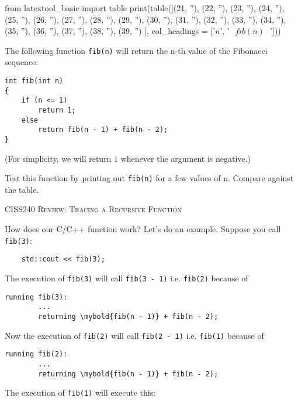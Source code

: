 \newpage
\begin{python}
from latextool_basic import table
print(table([(21, ''),
             (22, ''),
             (23, ''),
             (24, ''),
             (25, ''),
             (26, ''),
             (27, ''),
             (28, ''),
             (29, ''),
             (30, ''),
             (31, ''),
             (32, ''),
             (33, ''),
             (34, ''),
             (35, ''),
             (36, ''),
             (37, ''),
             (38, ''),
             (39, '')
            ],
            col_headings = ['$n$', '$\ \ \ fib(n)\ \ \ $']))
\end{python}

The following function \verb!fib(n)! will return the n-th value of the Fibonacci sequence:


\begin{Verbatim}[frame=single]
int fib(int n)
{
    if (n <= 1)
        return 1;
    else
        return fib(n - 1) + fib(n - 2);
}
\end{Verbatim}

(For simplicity, we will return 1 whenever the argument is negative.)

Test this function by printing out \verb!fib(n)! for a few values of n.
Compare against the table.



\newpage
\textsc{CISS240 Review: Tracing a Recursive Function}

How does our C/C++ function work? Let's do an example. Suppose you call \verb!fib(3)!:

\verb!    std::cout << fib(3);!

The execution of \verb!fib(3)! will call \verb!fib(3 - 1)! i.e. \verb!fib(2)! because of

\begin{Verbatim}[frame=single, commandchars=\\\{\}]
    running fib(3):
        ...
        returning \mybold{fib(n - 1)} + fib(n - 2);
\end{Verbatim}

Now the execution of \verb!fib(2)! will call \verb!fib(2 - 1)! i.e. \verb!fib(1)! because of

\begin{Verbatim}[frame=single, commandchars=\\\{\}]
    running fib(2):
        ...
        returning \mybold{fib(n - 1)} + fib(n - 2);
\end{Verbatim}

The execution of \verb!fib(1)! will execute this:

